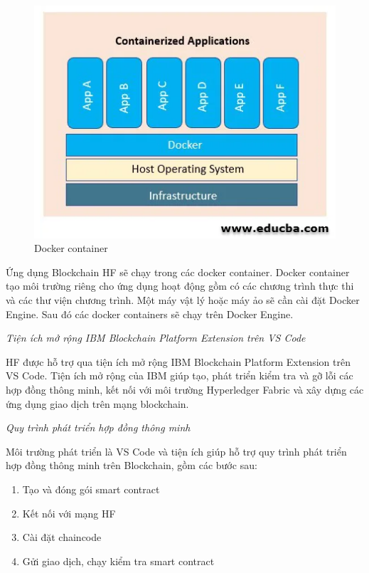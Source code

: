 \begin{figure}[htbp]
\centering
\includegraphics[width=.9\linewidth]{img/docker.png}
\caption{Docker container}
\label{fig:docker.png}
\end{figure}

Ứng dụng Blockchain HF sẽ chạy trong các docker container. Docker container tạo môi trường riêng cho ứng dụng hoạt động gồm có các chương trình thực thi và các thư viện chương trình. Một máy vật lý hoặc máy ảo sẽ cần cài đặt Docker Engine. Sau đó các docker containers sẽ chạy trên Docker Engine.

\emph{Tiện ích mở rộng  IBM Blockchain Platform Extension trên VS Code}

HF được hỗ trợ  qua tiện ích mở rộng IBM Blockchain Platform Extension trên VS Code. Tiện ích mở rộng của IBM giúp tạo,  phát triển kiểm tra và gỡ lỗi các hợp đồng thông minh, kết nối với môi trường Hyperledger Fabric và xây dựng các ứng dụng giao dịch trên mạng blockchain.

\emph{Quy trình phát triển hợp đồng thông minh}

Môi trường phát triển là VS Code và tiện ích giúp hỗ trợ quy trình phát  triển hợp đồng thông minh trên Blockchain, gồm các bước sau:
\begin{enumerate}
	\item Tạo và đóng gói smart contract
	\item Kết nối với mạng HF
	\item Cài đặt chaincode
	\item Gửi giao dịch, chạy kiểm tra smart contract
\end{enumerate}



